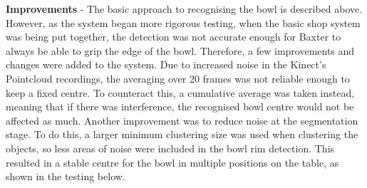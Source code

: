 \newline\newline
\textbf{Improvements} - 
The basic approach to recognising the bowl is described above. However, as the system began more rigorous testing, when the basic shop system was being put together, the detection was not accurate enough for Baxter to always be able to grip the edge of the bowl. Therefore, a few improvements and changes were added to the system.
\newline\newline
Due to increased noise in the Kinect's Pointcloud recordings, the averaging over 20 frames was not reliable enough to keep a fixed centre. To counteract this, a cumulative average was taken instead, meaning that if there was interference, the recognised bowl centre would not be affected as much. Another improvement was to reduce noise at the segmentation stage. To do this, a larger minimum clustering size was used when clustering the objects, so less areas of noise were included in the bowl rim detection. This resulted in a stable centre for the bowl in multiple positions on the table, as shown in the testing below.
